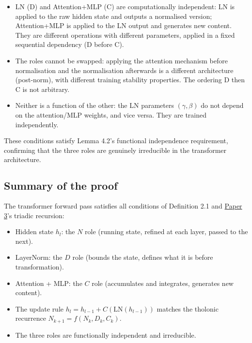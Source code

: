 \documentclass[12pt]{article}
\providecommand{\tightlist}{%
  \setlength{\itemsep}{0pt}\setlength{\parskip}{0pt}}
\begin{document}
\begin{itemize}
\tightlist
\item
  LN (D) and Attention+MLP (C) are computationally independent: LN is
  applied to the raw hidden state and outputs a normalised version;
  Attention+MLP is applied to the LN output and generates new content.
  They are different operations with different parameters, applied in a
  fixed sequential dependency (D before C).
\item
  The roles cannot be swapped: applying the attention mechanism before
  normalisation and the normalisation afterwards is a different
  architecture (post-norm), with different training stability
  properties. The ordering D then C is not arbitrary.
\item
  Neither is a function of the other: the LN parameters
  \((\gamma, \beta)\) do not depend on the attention/MLP weights, and
  vice versa. They are trained independently.
\end{itemize}

These conditions satisfy Lemma 4.2's functional independence
requirement, confirming that the three roles are genuinely irreducible
in the transformer architecture.

\subsection{Summary of the proof}\label{summary-of-the-proof}

The transformer forward pass satisfies all conditions of Definition 2.1
and
\href{https://github.com/baardev/truevalue/blob/main/docnav/Research/papers/3_minimal-recursive-triadic-framework/3_minimal-recursive-triadic-framework.pdf}{Paper
3}'s triadic recursion:

\begin{itemize}
\tightlist
\item
  Hidden state \(h_l\): the \(N\) role (running state, refined at each
  layer, passed to the next).
\item
  LayerNorm: the \(D\) role (bounds the state, defines what it is before
  transformation).
\item
  Attention + MLP: the \(C\) role (accumulates and integrates, generates
  new content).
\item
  The update rule \(h_l = h_{l-1} + C(\text{LN}(h_{l-1}))\) matches the
  tholonic recurrence \(N_{k+1} = f(N_k, D_k, C_k)\).
\item
  The three roles are functionally independent and irreducible.
\end{itemize}
\end{document}

